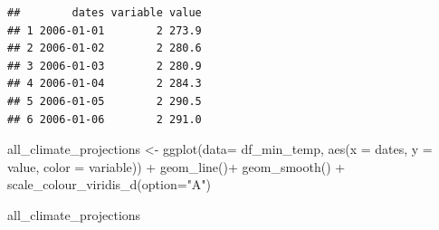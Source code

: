 \documentclass[
  paper=a4,
  ,captions=tableheading
]{scrartcl}
\newenvironment{Shaded}{\begin{snugshade}}{\end{snugshade}}
\newcommand{\AttributeTok}[1]{\textcolor[rgb]{0.77,0.63,0.00}{#1}}
\newcommand{\CommentTok}[1]{\textcolor[rgb]{0.56,0.35,0.01}{\textit{#1}}}
\newcommand{\DecValTok}[1]{\textcolor[rgb]{0.00,0.00,0.81}{#1}}
\newcommand{\FunctionTok}[1]{\textcolor[rgb]{0.00,0.00,0.00}{#1}}
\newcommand{\NormalTok}[1]{#1}
\newcommand{\OtherTok}[1]{\textcolor[rgb]{0.56,0.35,0.01}{#1}}
\newcommand{\SpecialCharTok}[1]{\textcolor[rgb]{0.00,0.00,0.00}{#1}}
\newcommand{\StringTok}[1]{\textcolor[rgb]{0.31,0.60,0.02}{#1}}
\begin{document}
\begin{Shaded}
\end{Shaded}

\begin{verbatim}
##        dates variable value
## 1 2006-01-01        2 273.9
## 2 2006-01-02        2 280.6
## 3 2006-01-03        2 280.9
## 4 2006-01-04        2 284.3
## 5 2006-01-05        2 290.5
## 6 2006-01-06        2 291.0
\end{verbatim}

\begin{Shaded}
\begin{Highlighting}[]
\NormalTok{all\_climate\_projections }\OtherTok{\textless{}{-}} \FunctionTok{ggplot}\NormalTok{(}\AttributeTok{data=}\NormalTok{ df\_min\_temp, }\FunctionTok{aes}\NormalTok{(}\AttributeTok{x =}\NormalTok{ dates, }\AttributeTok{y =}\NormalTok{ value, }\AttributeTok{color =}\NormalTok{ variable)) }\SpecialCharTok{+} 
  \FunctionTok{geom\_line}\NormalTok{()}\SpecialCharTok{+}
  \FunctionTok{geom\_smooth}\NormalTok{() }\SpecialCharTok{+}
  \FunctionTok{scale\_colour\_viridis\_d}\NormalTok{(}\AttributeTok{option=}\StringTok{"A"}\NormalTok{)}
  

\NormalTok{all\_climate\_projections}
\end{Highlighting}
\end{Shaded}
\end{document}
